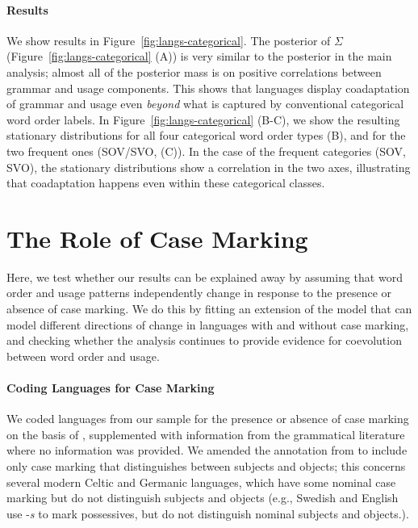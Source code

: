 \documentclass[11pt,a4paper]{article}
\begin{document}
\paragraph{Results}
We show results in Figure~\ref{fig:langs-categorical}.
The posterior of $\Sigma$ (Figure~\ref{fig:langs-categorical} (A)) is very similar to the posterior in the main analysis; almost all of the posterior mass is on positive correlations between grammar and usage components.
This shows that languages display coadaptation of grammar and usage even \emph{beyond} what is captured by conventional categorical word order labels.
In Figure~\ref{fig:langs-categorical} (B-C), we show the resulting stationary distributions for all four categorical word order types (B), and for the two frequent ones (SOV/SVO, (C)).
In the case of the frequent categories (SOV, SVO), the stationary distributions show a correlation in the two axes, illustrating that coadaptation happens even within these categorical classes.

\section{The Role of Case Marking}

Here, we test whether our results can be explained away by assuming that word order and usage patterns independently change in response to the presence or absence of case marking.
We do this by fitting an extension of the model that can model different directions of change in languages with and without case marking, and checking whether the analysis continues to provide evidence for coevolution between word order and usage.

\paragraph{Coding Languages for Case Marking}
We coded languages from our sample for the presence or absence of case marking on the basis of \citep{wals-49}, supplemented with information from the grammatical literature where no information was provided.
We amended the annotation from \citep{wals-49} to include only case marking that distinguishes between subjects and objects; this concerns several modern Celtic and Germanic languages, which have some nominal case marking but do not distinguish subjects and objects (e.g., Swedish and English use -\textit{s} to mark possessives, but do not distinguish nominal subjects and objects.).
\end{document}
